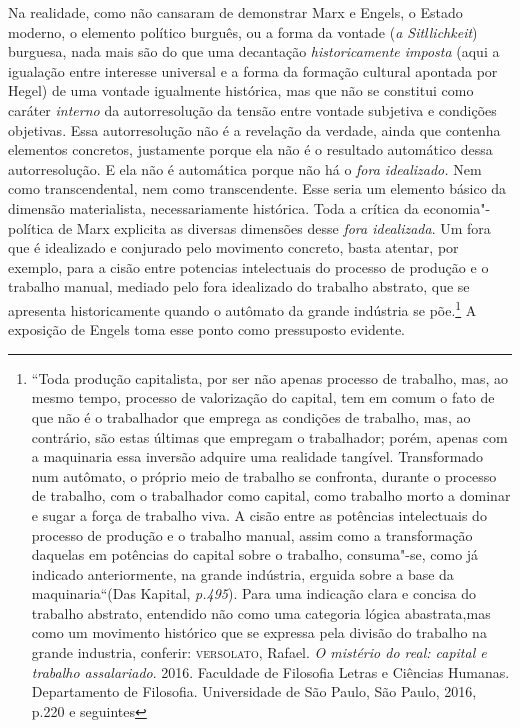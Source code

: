 Na realidade, como não cansaram de demonstrar Marx e Engels, o Estado
moderno, o elemento político burguês, ou a forma da vontade (\emph{a
Sitllichkeit}) burguesa, nada mais são do que uma decantação
\emph{historicamente imposta} (aqui a igualação entre interesse
universal e a forma da formação cultural apontada por Hegel) de uma
vontade igualmente histórica, mas que não se constitui como caráter
\emph{interno} da autorresolução da tensão entre vontade subjetiva e
condições objetivas. Essa autorresolução não é a revelação da verdade,
ainda que contenha elementos concretos, justamente porque ela não é o
resultado automático dessa autorresolução. E ela não é automática
porque não há o \emph{fora idealizado.} Nem como transcendental, nem
como transcendente. Esse seria um elemento básico da dimensão
materialista, necessariamente histórica. Toda a crítica da
economia"-política de Marx explicita as diversas dimensões desse
\emph{fora idealizada}. Um fora que é idealizado e conjurado pelo
movimento concreto, basta atentar, por exemplo, para a cisão entre
potencias intelectuais do processo de produção e o trabalho manual,
mediado pelo fora idealizado do trabalho abstrato, que se apresenta
historicamente quando o autômato da grande indústria se põe.\footnote{``Toda
  produção capitalista, por ser não apenas processo de trabalho, mas, ao
  mesmo tempo, processo de valorização do capital, tem em comum o fato
  de que não é o trabalhador que emprega as condições de trabalho, mas,
  ao contrário, são estas últimas que empregam o trabalhador; porém,
  apenas com a maquinaria essa inversão adquire uma realidade tangível.
  Transformado num autômato, o próprio meio de trabalho se confronta,
  durante o processo de trabalho, com o trabalhador como capital, como
  trabalho morto a dominar e sugar a força de trabalho viva. A cisão
  entre as potências intelectuais do processo de produção e o trabalho
  manual, assim como a transformação daquelas em potências do capital
  sobre o trabalho, consuma"-se, como já indicado anteriormente, na
  grande indústria, erguida sobre a base da maquinaria``(Das Kapital,
  \emph{p.495}). Para uma indicação clara e concisa do trabalho
  abstrato, entendido não como uma categoria lógica abastrata,mas como
  um movimento histórico que se expressa pela divisão do trabalho na
  grande industria, conferir: \textsc{versolato}, Rafael. \emph{O
  mistério do real: capital e trabalho assalariado}. 2016. Faculdade de
  Filosofia Letras e Ciências Humanas. Departamento de Filosofia.
  Universidade de São Paulo, São Paulo, 2016, p.220 e seguintes} A
exposição de Engels toma esse ponto como pressuposto evidente.

